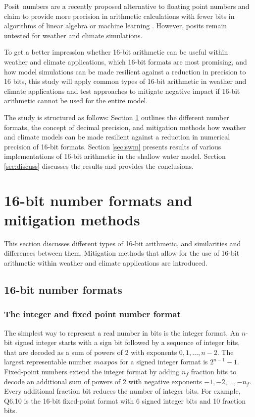 \documentclass[draft]{agujournal2019}
\begin{document}
Posit\texttrademark ~numbers are a recently proposed alternative to floating point numbers and claim to provide more precision in arithmetic calculations with fewer bits in algorithms of linear algebra or machine learning \cite{Gustafson2017,Langroudi2019}. However, posits remain untested for weather and climate simulations.

To get a better impression whether 16-bit arithmetic can be useful within weather and climate applications, which 16-bit formats are most promising, and how model simulations can be made resilient against a reduction in precision to 16 bits, this study will apply common types of 16-bit arithmetic in weather and climate applications and test approaches to mitigate negative impact if 16-bit arithmetic cannot be used for the entire model.

The study is structured as follows: Section \ref{sec:formats} outlines the
different number formats, the concept of decimal precision, and mitigation
methods how weather and climate models can be made resilient against a reduction
in numerical precision of 16-bit formats. Section \ref{sec:swm} presents results
of various implementations of 16-bit arithmetic in the shallow water model.
Section \ref{sec:discuss} discusses the results and provides the conclusions.

\section{16-bit number formats and mitigation methods}
\label{sec:formats}

This section discusses different types of 16-bit arithmetic, and similarities
and differences between them. Mitigation methods that allow for the use of
16-bit arithmetic within weather and climate applications are introduced.

\subsection{16-bit number formats}

\subsubsection{The integer and fixed point number format}
\label{sec:integer}

The simplest way to represent a real number in bits is the integer format.
An $n$-bit signed integer starts with a sign bit followed by a sequence of integer
bits, that are decoded as a sum of powers of 2 with exponents $0,1,...,n-2$.
The largest representable number $maxpos$ for a signed integer format is $2^{n-1}-1$.
Fixed-point numbers extend the integer format by adding $n_f$ fraction bits to
decode an additional sum of powers of 2 with negative exponents $-1,-2,...,-n_f$.
Every additional fraction bit reduces the number of integer bits. For example,
Q6.10 is the 16-bit fixed-point format with 6 signed integer bits and 10 fraction bits.
\end{document}
